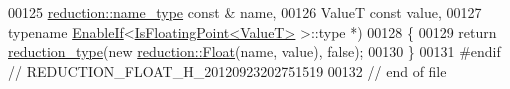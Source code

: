 \begin{DoxyCode}
00125     \hyperlink{classhryky_1_1reduction_1_1_string}{reduction::name_type} \textcolor{keyword}{const} & name,
00126     ValueT \textcolor{keyword}{const} value,
00127     \textcolor{keyword}{typename} \hyperlink{classhryky_1_1_enable_if}{EnableIf}<\hyperlink{classhryky_1_1_is_floating_point}{IsFloatingPoint<ValueT>} >::type *)
00128 \{
00129     \textcolor{keywordflow}{return} \hyperlink{namespacehryky_a343a9a4c36a586be5c2693156200eadc}{reduction_type}(\textcolor{keyword}{new} \hyperlink{classhryky_1_1reduction_1_1_float}{reduction::Float}(name, value), \textcolor{keyword}{false});
00130 \}
00131 \textcolor{preprocessor}{#endif // REDUCTION\_FLOAT\_H\_20120923202751519}
00132 \textcolor{preprocessor}{}\textcolor{comment}{// end of file}
\end{DoxyCode}
